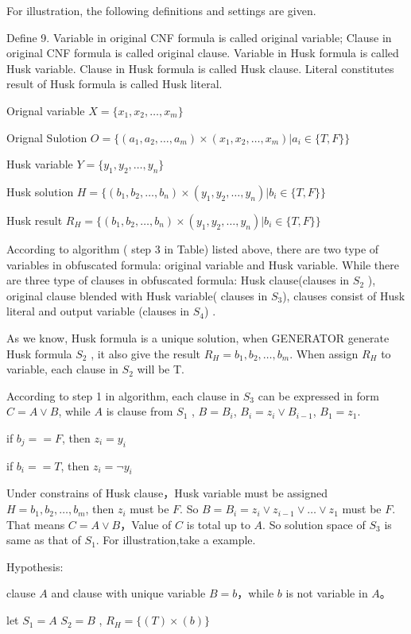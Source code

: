 \documentclass[runningheads,a4paper]{llncs}
\begin{document}
For illustration, the following definitions and settings are given.

\noindent Define 9. Variable in original CNF formula is called original variable; Clause in original CNF formula is called original clause. Variable in Husk formula is called Husk variable. Clause in Husk formula is called Husk clause. Literal constitutes result of Husk formula is called Husk literal.

Orignal variable	$X=\{x_1,x_2,\dots,x_m\}$

Orignal Sulotion	$O=\{(a_1,a_2,\dots,a_m)\times(x_1,x_2,\dots,x_m) | a_i∈ \{T,F\}\}$

Husk variable  	        $Y=\{y_1,y_2,\dots,y_n \}$

Husk solution	        $H=\{(b_1,b_2,\dots,b_n)\times(y_1,y_2,\dots,y_n) | b_i∈ \{T,F\}\}$

Husk result	        $R_H=\{(b_1,b_2,\dots,b_n)\times(y_1,y_2,\dots,y_n)| b_i∈ \{T,F\}\}$

According to algorithm ( step 3 in Table) listed above, there are two type of variables in obfuscated formula: original variable and Husk variable. 
While there are three type of clauses in obfuscated formula: Husk clause(clauses in $S_2$ ),
original clause blended with Husk variable( clauses in $S_3$),
clauses consist of Husk literal and output variable (clauses in $S_4$) .

As we know, Husk formula is a unique solution, when GENERATOR generate Husk formula $S_2$ , it also give the result $R_H={b_1,b_2,\dots,b_m}$. When assign $R_H$ to variable, each clause in $S_2$ will be T.

According to step 1 in algorithm, each clause in $S_3$ can be expressed in form $C=A\vee B$, while $A$ is clause from $S_1$ , $B=B_i$, $B_i=z_i\vee B_{i-1}$, $B_1= z_1$.

if $b_j==F$, then $z_i =y_i$

if $b_i==T$, then $z_i = \neg y_i$

Under constrains of Husk clause，Husk variable must be assigned $H={b_1,b_2,\dots,b_m}$, then $z_i$ must be $F$. So $B=B_i=z_i\vee z_{i-1}\vee\dots\vee z_1$ must be $F$. 
That means $C=A\vee B$，Value of $C$ is total up to $A$. So solution space of $S_3$ is same as that of $S_1$. For illustration,take a example.

\noindent Hypothesis:

clause $A$ and clause with unique variable $B=b$，while $b$ is not variable in $A$。

let $S_1=A$  $S_2=B$ , $R_H=\{(T)\times(b)\}$
\end{document}
